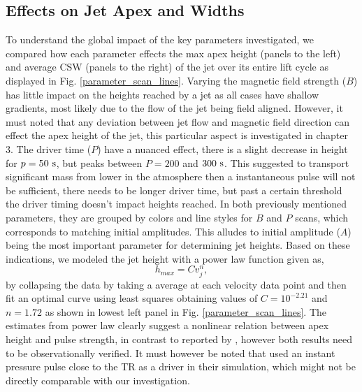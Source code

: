 \documentclass[12pt]{ociamthesis}
\newcommand{\fref}[1]{Fig. \eqref{#1}}
\newcommand{\np}{\\ \\}
\begin{document}
\subsection{Effects on Jet Apex and Widths}
\label{subsec:jet_apex_widths}
To understand the global impact of the key parameters investigated, we compared how each parameter effects the max apex height (panels to the left) and average CSW (panels to the right) of the jet over its entire lift cycle as displayed in \fref{parameter_scan_lines}. Varying the magnetic field strength ($B$) has little impact on the heights reached by a jet as all cases have shallow gradients, most likely due to the flow of the jet being field aligned. However, it must noted that any deviation between jet flow and magnetic field direction can effect the apex height of the jet, this particular aspect is investigated in chapter 3. The driver time ($P$) have a nuanced effect, there is a slight decrease in height for $p=50~\rm{s}$, but peaks between $P=200$ and $300~\rm{s}$. This suggested to transport significant mass from lower in the atmosphere then a instantaneous pulse will not be sufficient, there needs to be longer driver time, but past a certain threshold the driver timing doesn't impact heights reached. In both previously mentioned parameters, they are grouped by colors and line styles for $B$ and $P$ scans, which corresponds to matching initial amplitudes. This alludes to initial amplitude ($A$) being the most important parameter for determining jet heights. Based on these indications, we modeled the jet height with a power law function given as,   
\begin{equation}
h_{max} = C v_j^{n},
\end{equation} 
by collapsing the data by taking a average at each velocity data point and then fit an optimal curve using least squares obtaining values of $C= 10^{-2.21}$ and $n= 1.72$ as shown in lowest left panel in \fref{parameter_scan_lines}. The estimates from power law clearly suggest a nonlinear relation between apex height and pulse strength, in contrast to reported by \citet{Singh2019}, however both results need to be observationally verified. It must however be noted that \citet{Singh2019} used an instant pressure pulse close to the TR as a driver in their simulation, which might not be directly comparable with our investigation. \np  
%
\end{document}
